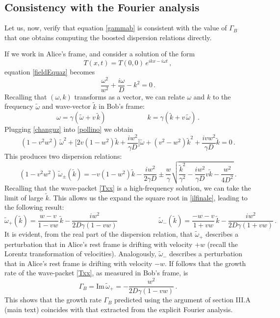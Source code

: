 \documentclass[a4paper, amsfonts, amssymb, amsmath, reprint, showkeys,  twoside, onecolumn,notitlepage,nofootinbib]{revtex4-1}
\newcommand{\spc}{\quad \quad \quad}
\theoremstyle{definition}
\theoremstyle{theorem}
\begin{document}
\subsection*{Consistency with the Fourier analysis}

Let us, now, verify that equation \eqref{gammab} is consistent with the value of $\Gamma_B$ that one obtains computing the boosted dispersion relations directly.

If we work in Alice's frame, and consider a solution of the form
\begin{equation}
T(x,t)=T(0,0) \, e^{ikx-i\omega t} \, ,
\end{equation} 
equation \eqref{fieldEquaz} becomes
\begin{equation}\label{pollino}
\dfrac{\omega^2}{w^2} + \dfrac{i \omega}{D} - k^2 =0 \, .
\end{equation}
Recalling that $(\omega,k)$ transforms as a vector, we can relate $\omega$ and $k$ to the frequency $\tilde{\omega}$ and wave-vector $\tilde{k}$ in Bob's frame:
\begin{equation}\label{changuz}
\omega = \gamma (\tilde{\omega}+v \, \tilde{k}) \spc \spc k = \gamma (\tilde{k}+v \, \tilde{\omega}) \, .
\end{equation}
Plugging \eqref{changuz} into \eqref{pollino} we obtain
\begin{equation}
(1-v^2 w^2) \, \tilde{\omega}^2 + \bigg[ 2v(1-w^2)\tilde{k} + \dfrac{iw^2}{\gamma D}  \bigg] \tilde{\omega} + (v^2-w^2)\tilde{k}^2 + \dfrac{ivw^2}{\gamma D} \tilde{k}=0 \, .
\end{equation}
This produces two dispersion relations:
\begin{equation}\label{ilfinale}
(1-v^2 w^2) \, \tilde{\omega}_{\pm}(\tilde{k}) = -v(1-w^2)\tilde{k}-\dfrac{iw^2}{2\gamma D} \pm \dfrac{w}{\gamma} \sqrt{\dfrac{\tilde{k}^2}{\gamma^2} - \dfrac{iw^2}{\gamma D} v \tilde{k} - \dfrac{w^2}{4D^2}} \, .
\end{equation}
Recalling that the wave-packet \eqref{Txx} is a high-frequency solution, we can take the limit of large $\tilde{k}$. This allows us the expand the square root in \eqref{ilfinale}, leading to the following result:
\begin{equation}
 \tilde{\omega}_+ (\tilde{k}) = \dfrac{w-v}{1-vw} \, \tilde{k} - \dfrac{iw^2}{2 D \gamma (1-vw)}   \spc \spc  \tilde{\omega}_-  (\tilde{k})= \dfrac{-w-v}{1+vw} \, \tilde{k} - \dfrac{iw^2}{2 D \gamma (1+vw)} \, .  
\end{equation}
It is evident, from the real part of the dispersion relation, that $\tilde{\omega}_+$ describes a perturbation that in Alice's rest frame is drifting with velocity $+w$ (recall the Lorentz transformation of velocities). Analogously, $\tilde{\omega}_-$ describes a perturbation that in Alice's rest frame is drifting with velocity $-w$. If follows that the growth rate of the wave-packet \eqref{Txx}, as measured in Bob's frame, is
\begin{equation}
\Gamma_B = \text{Im} \, \tilde{\omega}_+ = - \dfrac{w^2}{2 D \gamma (1-vw)}  \, .
\end{equation}
This shows that the growth rate $\Gamma_B$ predicted using the argument of section III.A (main text) coincides with that extracted from the explicit Fourier analysis.
\end{document}
